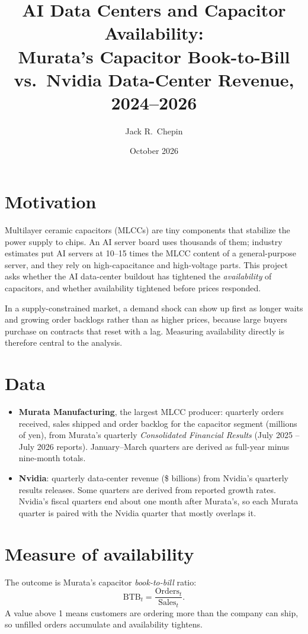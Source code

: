 \documentclass[11pt]{article}
\title{AI Data Centers and Capacitor Availability:\\
\large Murata's Capacitor Book-to-Bill vs.\ Nvidia Data-Center Revenue, 2024--2026}
\author{Jack R.\ Chepin}
\date{October 2026}
\begin{document}
\maketitle

\section{Motivation}
Multilayer ceramic capacitors (MLCCs) are tiny components that stabilize the power supply to chips.
An AI server board uses thousands of them; industry estimates put AI servers at 10--15 times the
MLCC content of a general-purpose server, and they rely on high-capacitance and high-voltage parts.
This project asks whether the AI data-center buildout has tightened the \emph{availability} of
capacitors, and whether availability tightened before prices responded.

In a supply-constrained market, a demand shock can show up first as longer waits and growing
order backlogs rather than as higher prices, because large buyers purchase on contracts that reset
with a lag. Measuring availability directly is therefore central to the analysis.

\section{Data}
\begin{itemize}
  \item \textbf{Murata Manufacturing}, the largest MLCC producer: quarterly orders received, sales
        shipped and order backlog for the capacitor segment (millions of yen), from Murata's
        quarterly \emph{Consolidated Financial Results} (July 2025 -- July 2026 reports).
        January--March quarters are derived as full-year minus nine-month totals.
  \item \textbf{Nvidia}: quarterly data-center revenue (\$ billions) from Nvidia's quarterly
        results releases. Some quarters are derived from reported growth rates. Nvidia's fiscal
        quarters end about one month after Murata's, so each Murata quarter is paired with the
        Nvidia quarter that mostly overlaps it.
\end{itemize}

\section{Measure of availability}
The outcome is Murata's capacitor \emph{book-to-bill} ratio:
\begin{equation}
  \text{BTB}_t = \frac{\text{Orders}_t}{\text{Sales}_t}.
\end{equation}
A value above 1 means customers are ordering more than the company can ship, so unfilled orders
accumulate and availability tightens.
\end{document}
